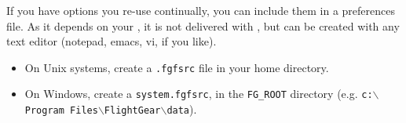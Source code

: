 If you have options you re-use continually, you can include them in a preferences file. As it depends on your
, it is not delivered with \FlightGear{}, but can be created with any text editor (notepad, emacs, vi, if you like). 

\begin{itemize}
\item On Unix systems, create a \texttt{.fgfsrc} file in your home directory.
\item On Windows, create a \texttt{system.fgfsrc}, in
the \texttt{FG\_ROOT} directory (e.g. \texttt{c:$\backslash$Program Files$\backslash$FlightGear$\backslash$data}). 
\end{itemize}

